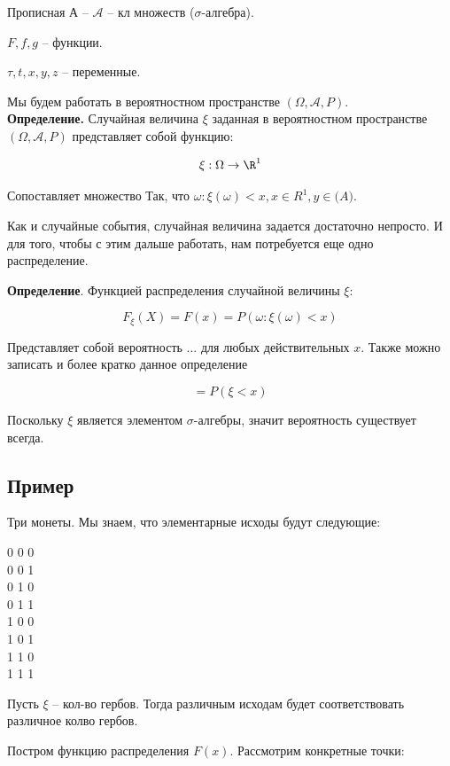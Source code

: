 \documentclass{article}
\begin{document}
Прописная А -- $\mathcal{A}$ -- кл множеств ($\sigma$-алгебра).

$F, f, g$ -- функции.

$\tau, t, x, y, z$ -- переменные.

Мы будем работать в вероятностном пространстве $(\Omega, \mathcal{A}, P)$.
\\

\textbf{Определение.} Случайная величина $\xi$ заданная в вероятностном пространстве $(\Omega, \mathcal{A}, P)$ представляет собой функцию:

$$ \xi : \Omega \rightarrow \R ^1$$

Сопоставляет множество Так, что ${\omega : \xi(\omega) < x, x \in R ^ 1, y \in \mathcal(A)}$. 

Как и случайные события, случайная величина задается достаточно непросто. И для того, чтобы с этим дальше работать, нам потребуется еще одно распределение.

\textbf{Определение}. Функцией распределения случайной величины $\xi$: 

$$F_{\xi}(X) = F(x) = P({\omega : \xi(\omega) < x}) $$

Представляет собой вероятность ... для любых действительных $x$. Также можно записать и более кратко данное определение

$$ = P(\xi < x) $$

Поскольку $\xi$ является элементом $\sigma$-алгебры, значит вероятность существует всегда.

\subsection{Пример}

Три монеты. Мы знаем, что элементарные исходы будут следующие:

\begin{center}
0 0 0\\
0 0 1\\
0 1 0\\
0 1 1\\
1 0 0\\
1 0 1\\
1 1 0\\
1 1 1
\end{center}

Пусть $\xi$ -- кол-во гербов. Тогда различным исходам будет соответствовать различное колво гербов.

Постром функцию распределения $F(x)$. Рассмотрим конкретные точки:
\\
\end{document}
